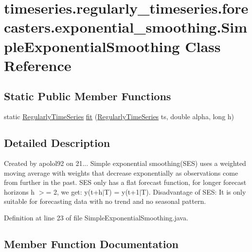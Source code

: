\hypertarget{classtimeseries_1_1regularly__timeseries_1_1forecasters_1_1exponential__smoothing_1_1_simple_exponential_smoothing}{}\section{timeseries.\+regularly\+\_\+timeseries.\+forecasters.\+exponential\+\_\+smoothing.\+Simple\+Exponential\+Smoothing Class Reference}
\label{classtimeseries_1_1regularly__timeseries_1_1forecasters_1_1exponential__smoothing_1_1_simple_exponential_smoothing}
\subsection*{Static Public Member Functions}
\begin{DoxyCompactItemize}
\item 
static \hyperlink{classtimeseries_1_1_regularly_time_series}{Regularly\+Time\+Series} \hyperlink{classtimeseries_1_1regularly__timeseries_1_1forecasters_1_1exponential__smoothing_1_1_simple_exponential_smoothing_afebe870f327de6fa5215edbe4b9c0e3e}{fit} (\hyperlink{classtimeseries_1_1_regularly_time_series}{Regularly\+Time\+Series} ts, double alpha, long h)
\end{DoxyCompactItemize}


\subsection{Detailed Description}
Created by apolol92 on 21... Simple exponential smoothing(\+S\+E\+S) uses a weighted moving average with weights that decrease exponentially as observations come from further in the past. S\+E\+S only has a flat forecast function, for longer forecast horizons h $>$= 2, we get\+: y(t+h$\vert$\+T) = y(t+1$\vert$\+T). Disadvantage of S\+E\+S\+: It is only suitable for forecasting data with no trend and no seasonal pattern. 

Definition at line 23 of file Simple\+Exponential\+Smoothing.\+java.



\subsection{Member Function Documentation}
\hypertarget{classtimeseries_1_1regularly__timeseries_1_1forecasters_1_1exponential__smoothing_1_1_simple_exponential_smoothing_afebe870f327de6fa5215edbe4b9c0e3e}{}
